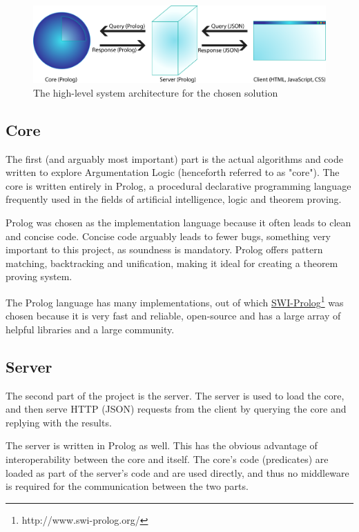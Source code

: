 \documentclass[11pt,twoside,a4paper]{report}
\begin{document}
\begin{figure}[h]
\centerline{\includegraphics[scale=0.5]{img/system-diagram.png}}
\caption{The high-level system architecture for the chosen solution\label{fig:archdiag}}
\end{figure}

\subsection{Core}
The first (and arguably most important) part is the actual algorithms and code written to explore Argumentation Logic (henceforth referred to as "core"). The core is written entirely in Prolog, a procedural declarative programming language frequently used in the fields of artificial intelligence, logic and theorem proving. 

Prolog was chosen as the implementation language because it often leads to clean and concise code. Concise code arguably leads to fewer bugs, something very important to this project, as soundness is mandatory. Prolog offers pattern matching, backtracking and unification, making it ideal for creating a theorem proving system.

The Prolog language has many implementations, out of which \href{http://www.swi-prolog.org/}{SWI-Prolog}\footnote{http://www.swi-prolog.org/} was chosen because it is very fast and reliable, open-source and has a large array of helpful libraries and a large community.

\subsection{Server}
The second part of the project is the server. The server is used to load the core, and then serve HTTP (JSON) requests from the client by querying the core and replying with the results.

The server is written in Prolog as well. This has the obvious advantage of interoperability between the core and itself. The core's code (predicates) are loaded as part of the server's code and are used directly, and thus no middleware is required for the communication between the two parts.
\end{document}
